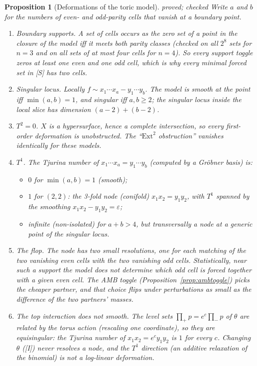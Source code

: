 \documentclass[11pt]{article}
\newtheorem{proposition}[theorem]{Proposition}
\theoremstyle{definition}
\theoremstyle{remark}
\newcommand{\st}[1]{\textsf{\small\color{gray}#1}}
\begin{document}
\begin{proposition}[Deformations of the toric model]\label{prop:deform}\st{proved; checked}
Write $a$ and $b$ for the numbers of even- and odd-parity cells that vanish at a boundary point.
\begin{enumerate}
  \item \emph{Boundary supports.} A set of cells occurs as the zero set of a point in the closure of the model iff it meets both parity classes (checked on all $2^8$ sets for $n=3$ and on all sets of at most four cells for $n=4$). So every support toggle zeros at least one even and one odd cell, which is why every minimal forced set in [S] has two cells.
  \item \emph{Singular locus.} Locally $f\sim x_1\cdots x_a-y_1\cdots y_b$. The model is smooth at the point iff $\min(a,b)=1$, and singular iff $a,b\ge2$; the singular locus inside the local slice has dimension $(a-2)+(b-2)$.
  \item \emph{$T^2=0$.} $X$ is a hypersurface, hence a complete intersection, so every first-order deformation is unobstructed. The ``$\mathrm{Ext}^2$ obstruction'' vanishes identically for these models.
  \item \emph{$T^1$.} The Tjurina number of $x_1\cdots x_a=y_1\cdots y_b$ (computed by a Gr\"obner basis) is:
  \begin{itemize}
    \item $0$ for $\min(a,b)=1$ (smooth);
    \item $1$ for $(2,2)$: the 3-fold node (conifold) $x_1x_2=y_1y_2$, with $T^1$ spanned by the smoothing $x_1x_2-y_1y_2=\varepsilon$;
    \item infinite (non-isolated) for $a+b>4$, but transversally a node at a generic point of the singular locus.
  \end{itemize}
  \item \emph{The flop.} The node has two small resolutions, one for each matching of the two vanishing even cells with the two vanishing odd cells. Statistically, near such a support the model does not determine \emph{which} odd cell is forced together with a given even cell. The AMB toggle (Proposition~\ref{prop:ambtoggle}) picks the cheaper partner, and that choice flips under perturbations as small as the difference of the two partners' masses.
  \item \emph{The top interaction does not smooth.} The level sets $\prod_+p=e^{c}\prod_-p$ of $\theta$ are related by the torus action (rescaling one coordinate), so they are equisingular: the Tjurina number of $x_1x_2=e^cy_1y_2$ is $1$ for every $c$. Changing $\theta$ ([I]) never resolves a node, and the $T^1$ direction (an additive relaxation of the binomial) is not a log-linear deformation.
\end{enumerate}
\end{proposition}
\end{document}
